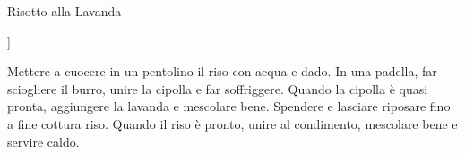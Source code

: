 \begin{recipe}{Risotto alla Lavanda}
    \begin{header}
    ]
    \end{header}
    
    \begin{ingredients}[8]
    \end{ingredients}
    
    \begin{preparation}
        \step Mettere a cuocere in un pentolino il riso con acqua e dado.
        \step In una padella, far sciogliere il burro, unire la cipolla e far soffriggere.
        \step Quando la cipolla è quasi pronta, aggiungere la lavanda e mescolare bene.
        \step Spendere e lasciare riposare fino a fine cottura riso.
        \step Quando il riso è pronto, unire al condimento, mescolare bene e servire caldo.
    \end{preparation}
\end{recipe}